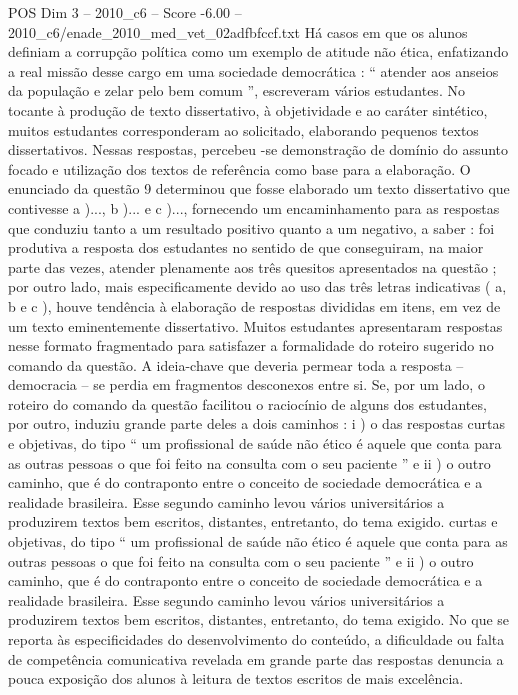 \begin{textsample}{POS Dim 3 – 2010\_c6 – Score -6.00 – 2010\_c6/enade\_2010\_med\_vet\_02adfbfccf.txt}
Há casos em que os alunos definiam a corrupção política como um exemplo de atitude não ética, enfatizando a real missão desse cargo em uma sociedade democrática : “ atender aos anseios da população e zelar pelo bem comum ”, escreveram vários estudantes.
No tocante à produção de texto dissertativo, à objetividade e ao caráter sintético, muitos estudantes corresponderam ao solicitado, elaborando pequenos textos dissertativos.
Nessas respostas, percebeu -se demonstração de domínio do assunto focado e utilização dos textos de referência como base para a elaboração.
O enunciado da questão 9 determinou que fosse elaborado um texto dissertativo que contivesse a )..., b )... e c )..., fornecendo um encaminhamento para as respostas que conduziu tanto a um resultado positivo quanto a um negativo, a saber : foi produtiva a resposta dos estudantes no sentido de que conseguiram, na maior parte das vezes, atender plenamente aos três quesitos apresentados na questão ; por outro lado, mais especificamente devido ao uso das três letras indicativas ( a, b e c ), houve tendência à elaboração de respostas divididas em itens, em vez de um texto eminentemente dissertativo.
Muitos estudantes apresentaram respostas nesse formato fragmentado para satisfazer a formalidade do roteiro sugerido no comando da questão.
A ideia-chave que deveria permear toda a resposta – democracia – se perdia em fragmentos desconexos entre si.
Se, por um lado, o roteiro do comando da questão facilitou o raciocínio de alguns dos estudantes, por outro, induziu grande parte deles a dois caminhos : i ) o das respostas curtas e objetivas, do tipo “ um profissional de saúde não ético é aquele que conta para as outras pessoas o que foi feito na consulta com o seu paciente ” e ii ) o outro caminho, que é do contraponto entre o conceito de sociedade democrática e a realidade brasileira.
Esse segundo caminho levou vários universitários a produzirem textos bem escritos, distantes, entretanto, do tema exigido. curtas e objetivas, do tipo “ um profissional de saúde não ético é aquele que conta para as outras pessoas o que foi feito na consulta com o seu paciente ” e ii ) o outro caminho, que é do contraponto entre o conceito de sociedade democrática e a realidade brasileira.
Esse segundo caminho levou vários universitários a produzirem textos bem escritos, distantes, entretanto, do tema exigido.
No que se reporta às especificidades do desenvolvimento do conteúdo, a dificuldade ou falta de competência comunicativa revelada em grande parte das respostas denuncia a pouca exposição dos alunos à leitura de textos escritos de mais excelência.

\end{textsample}
